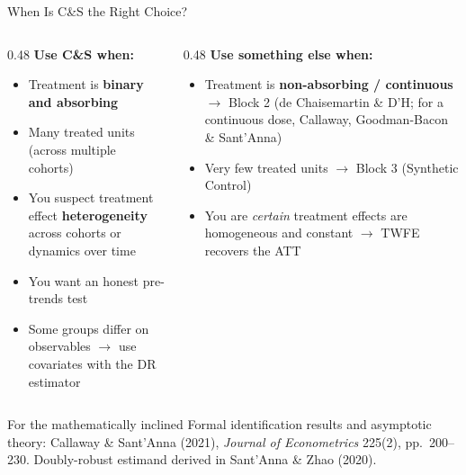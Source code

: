 \documentclass[main.tex]{subfiles}
\begin{document}
\begin{frame}{When Is C\&S the Right Choice?}

  \begin{columns}[T]
    \begin{column}{0.48\textwidth}
      \textbf{Use C\&S when:}
      \begin{itemize}
        \item Treatment is \textbf{binary and absorbing}
        \item Many treated units (across multiple cohorts)
        \item You suspect treatment effect \textbf{heterogeneity}
          across cohorts or dynamics over time
        \item You want an honest pre-trends test
        \item Some groups differ on observables $\to$ use covariates
          with the DR estimator
      \end{itemize}
    \end{column}
    \begin{column}{0.48\textwidth}
      \textbf{Use something else when:}
      \begin{itemize}
        \item Treatment is \textbf{non-absorbing / continuous}
          $\to$ Block 2 (de Chaisemartin \& D'H; for a continuous dose,
          Callaway, Goodman-Bacon \& Sant'Anna)
        \item Very few treated units
          $\to$ Block 3 (Synthetic Control)
        \item You are \emph{certain} treatment effects are
          homogeneous and constant $\to$ TWFE recovers the ATT
      \end{itemize}
    \end{column}
  \end{columns}

  \bigskip
  \begin{block}{For the mathematically inclined}
    \footnotesize
    Formal identification results and asymptotic theory:
    Callaway \& Sant'Anna (2021), \textit{Journal of Econometrics}
    225(2), pp.\ 200--230. Doubly-robust estimand derived in
    Sant'Anna \& Zhao (2020).
  \end{block}

\end{frame}

\end{document}
